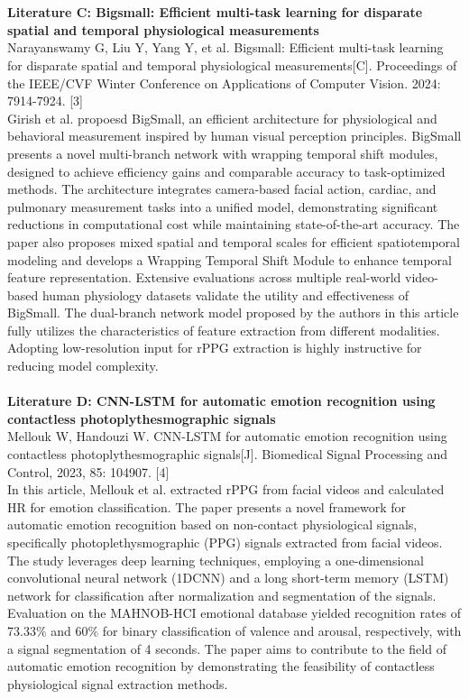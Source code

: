 \documentclass[11pt]{article}
\begin{document}
\\
\\\textbf{Literature C: Bigsmall: Efficient multi-task learning for disparate spatial and temporal physiological measurements}
\\Narayanswamy G, Liu Y, Yang Y, et al. Bigsmall: Efficient multi-task learning for disparate spatial and temporal physiological measurements[C]. Proceedings of the IEEE/CVF Winter Conference on Applications of Computer Vision. 2024: 7914-7924. [3]
\\Girish et al. propoesd BigSmall, an efficient architecture for physiological and behavioral measurement inspired by human visual perception principles. BigSmall presents a novel multi-branch network with wrapping temporal shift modules, designed to achieve efficiency gains and comparable accuracy to task-optimized methods. The architecture integrates camera-based facial action, cardiac, and pulmonary measurement tasks into a unified model, demonstrating significant reductions in computational cost while maintaining state-of-the-art accuracy. The paper also proposes mixed spatial and temporal scales for efficient spatiotemporal modeling and develops a Wrapping Temporal Shift Module to enhance temporal feature representation. Extensive evaluations across multiple real-world video-based human physiology datasets validate the utility and effectiveness of BigSmall. The dual-branch network model proposed by the authors in this article fully utilizes the characteristics of feature extraction from different modalities. Adopting low-resolution input for rPPG extraction is highly instructive for reducing model complexity.
\\
\\\textbf{Literature D: CNN-LSTM for automatic emotion recognition using contactless photoplythesmographic signals}
\\Mellouk W, Handouzi W. CNN-LSTM for automatic emotion recognition using contactless photoplythesmographic signals[J]. Biomedical Signal Processing and Control, 2023, 85: 104907. [4]
\\In this article, Mellouk et al. extracted rPPG from facial videos and calculated HR for emotion classification. The paper presents a novel framework for automatic emotion recognition based on non-contact physiological signals, specifically photoplethysmographic (PPG) signals extracted from facial videos. The study leverages deep learning techniques, employing a one-dimensional convolutional neural network (1DCNN) and a long short-term memory (LSTM) network for classification after normalization and segmentation of the signals. Evaluation on the MAHNOB-HCI emotional database yielded recognition rates of 73.33$\%$ and 60$\%$ for binary classification of valence and arousal, respectively, with a signal segmentation of 4 seconds. The paper aims to contribute to the field of automatic emotion recognition by demonstrating the feasibility of contactless physiological signal extraction methods.
\end{document}
